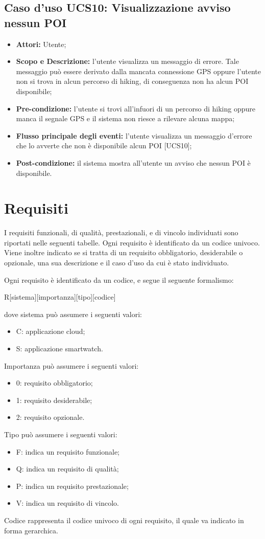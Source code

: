 \subsection{Caso d'uso UCS10: Visualizzazione avviso nessun POI}
\begin{itemize}
\item \textbf{Attori:} Utente;
\item \textbf{Scopo e Descrizione:} l'utente visualizza un messaggio di errore. Tale messaggio può essere derivato dalla mancata connessione GPS oppure l'utente non si trova in alcun percorso di hiking, di conseguenza non ha alcun POI disponibile;
\item \textbf{Pre-condizione:} l'utente si trovi all'infuori di un percorso di hiking oppure manca il segnale GPS e il sistema non riesce a rilevare alcuna mappa; 
\item \textbf{Flusso principale degli eventi:} l'utente visualizza un messaggio d'errore che lo avverte che non è disponibile alcun POI [UCS10];
\item \textbf{Post-condizione:} il sistema mostra all'utente un avviso che nessun POI è disponibile.
\end{itemize}


\clearpage
\section{Requisiti}
I requisiti funzionali, di qualità, prestazionali, e di vincolo individuati sono riportati nelle seguenti tabelle.
Ogni requisito è identificato da un codice univoco.
Viene inoltre indicato se si tratta di un requisito obbligatorio, desiderabile o opzionale, una sua descrizione e il caso d'uso da cui è stato individuato. 

Ogni requisito è identificato da un codice, e segue il seguente formalismo:
\begin{center}
R[sistema][importanza][tipo][codice]
\end{center}
dove sistema può assumere i seguenti valori:
\begin{itemize}
\item C: applicazione cloud;
\item S: applicazione smartwatch.
\end{itemize}
Importanza può assumere i seguenti valori:
\begin{itemize}
\item 0: requisito obbligatorio;
\item 1: requisito desiderabile;
\item 2: requisito opzionale.
\end{itemize}
Tipo può assumere i seguenti valori:
\begin{itemize}
\item F: indica un requisito funzionale;
\item Q: indica un requisito di qualità;
\item P: indica un requisito prestazionale;
\item V: indica un requisito di vincolo.
\end{itemize}
Codice rappresenta il codice univoco di ogni requisito, il quale va indicato in forma gerarchica.

